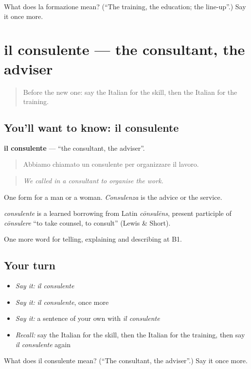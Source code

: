 \begin{tcolorbox}[breakable,colback=teal!4,colframe=teal!35!black,title={Before you move on}]
What does la formazione mean? (\textquotedblleft{}The training, the education; the line-up\textquotedblright{}.) Say it once more.
\end{tcolorbox}
\section[il consulente]{il consulente — the consultant, the adviser}

\label{lesson:IT-C361-consulente}



\begin{quote}
Before the new one: say the Italian for the skill, then the Italian for the training.
\end{quote}

\subsection*{You'll want to know: il consulente}
\textbf{il consulente} — \textquotedblleft{}the consultant, the adviser\textquotedblright{}.

\begin{quote}
Abbiamo chiamato un consulente per organizzare il lavoro.
\end{quote}

\begin{quote}
\emph{We called in a consultant to organise the work.}
\end{quote}

One form for a man or a woman. \emph{Consulenza} is the advice or the service.

\begin{cousinweb}
\emph{consulente} is a learned borrowing from Latin \emph{cōnsulēns}, present participle of \emph{cōnsulere} \textquotedblleft{}to take counsel, to consult\textquotedblright{} (Lewis \& Short).
\end{cousinweb}

\begin{grammarlens}[title={What you've built}]
One more word for telling, explaining and describing at B1.
\end{grammarlens}

\subsection*{Your turn}
\begin{itemize}
\raggedright
  \item \emph{Say it:} \emph{il consulente}
  \item \emph{Say it:} \emph{il consulente}, once more
  \item \emph{Say it:} a sentence of your own with \emph{il consulente}
  \item \emph{Recall:} say the Italian for the skill, then the Italian for the training, then say \emph{il consulente} again
\end{itemize}

\begin{tcolorbox}[breakable,colback=teal!4,colframe=teal!35!black,title={Before you move on}]
What does il consulente mean? (\textquotedblleft{}The consultant, the adviser\textquotedblright{}.) Say it once more.
\end{tcolorbox}
